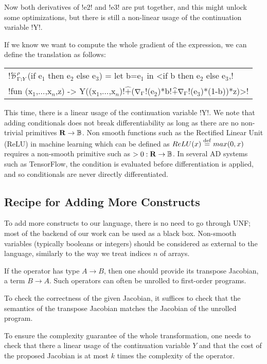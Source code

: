 Now both derivatives of !e2! and !e3! are put together, and this might unlock some optimizations, 
but there is still a non-linear usage of the continuation variable !Y!.

If we know we want to compute the whole gradient of the expression, we can define the translation as follows:

\begin{tabular}{l}
    !$\directD{\rho}{\Gamma}{Y}$(if e$_1$ then e$_2$ else e$_3$) = let b=e$_1$ in <if b then e$_2$ else e$_3$,! \\
    !fun (x$_1$,$\ldots$,x$_n$,z) -> Y((x$_1$,$\ldots$,x$_n$)!$\widehat{+}$($\nabla_\Gamma$!(e$_2$)*b!$\widehat{+}\nabla_\Gamma$!(e$_3$)*(1-b))*z)>!\\
\end{tabular}

This time, there is a linear usage of the continuation variable !Y!. We note that adding conditionals does not break differentiability as long as there are no non-trivial primitives $\mathbf{R}\to\mathbb{B}$.
Non smooth functions such as the Rectified Linear Unit (ReLU) in machine learning which can be defined as $ReLU(x)\stackrel {\mathrm{def}}= max(0,x)$ 
requires a non-smooth primitive such as $>0: \mathbf{R}\to\mathbb{B}$. In several AD systems such as TensorFlow, 
the condition is evaluated before differentiation is applied, and so conditionals are never directly differentiated.

\subsection{Recipe for Adding More Constructs}
\label{sub:lift_recipe}
To add more constructs to our language, 
there is no need to go through UNF; most of the backend of our work can be used as a black box.
Non-smooth variables (typically booleans or integers) should be considered as external to the language, similarly to the way we treat indices $n$ of arrays.

If the operator has type $A\to B$, then one should provide its transpose Jacobian, a term $B\to A$. 
Such operators can often be unrolled to first-order programs. 

To check the correctness of the given Jacobian, it suffices to 
check that the semantics of the transpose Jacobian matches the Jacobian of the unrolled program. 

To ensure the complexity guarantee of the whole transformation, one needs to check that there a linear usage of the continuation variable $Y$ and that the cost of the 
proposed Jacobian is at most $k$ times the complexity of the operator. 
